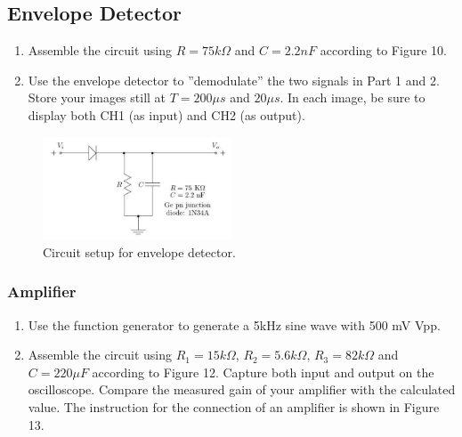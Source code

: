 \documentclass [utf8] {article}
\begin{document}
\subsection{Envelope Detector}
{
	\begin{enumerate}
		\item Assemble the circuit using $R = 75 k\Omega$ and $C = 2.2nF$ according to Figure 10.
		\item Use the envelope detector to ”demodulate” the two signals in Part 1 and 2. Store your images still at $T = 200\mu s$ and $20\mu s$. In each image, be sure to display both CH1 (as input) and CH2 (as output).
	\end{enumerate}

	\begin{figure}[H]
		\begin{small}
			\begin{center}
				\includegraphics[width=0.5\textwidth]{figures/Figure11.png}
			\end{center}
			\caption{Circuit setup for envelope detector.}
			\label{fig:setup1}
		\end{small}
	\end{figure}

	\subsubsection{Amplifier}
	\begin{enumerate}
		\item Use the function generator to generate a 5kHz sine wave with 500 mV Vpp.
		\item Assemble the circuit using $R_1 = 15k\Omega$, $R_2 = 5.6k\Omega$, $R_3 = 82k\Omega$ and $C = 220\mu F$ according to Figure 12. Capture both input and output on the oscilloscope. Compare the measured gain of your amplifier with the calculated value. The instruction for the connection of an amplifier is shown in Figure 13.
	\end{enumerate}

}
\end{document}
